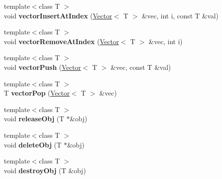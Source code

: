 \begin{DoxyCompactItemize}
\item 
{\footnotesize template$<$class T $>$ }\\void {\bfseries vector\+Insert\+At\+Index} (\hyperlink{struct_object_script_1_1_o_s_1_1_vector}{Vector}$<$ T $>$ \&vec, int i, const T \&val)\hypertarget{class_object_script_1_1_o_s_a0bf87d6ef789ccd8a3dcb03cbbb5893e}{}\label{class_object_script_1_1_o_s_a0bf87d6ef789ccd8a3dcb03cbbb5893e}

\item 
{\footnotesize template$<$class T $>$ }\\void {\bfseries vector\+Remove\+At\+Index} (\hyperlink{struct_object_script_1_1_o_s_1_1_vector}{Vector}$<$ T $>$ \&vec, int i)\hypertarget{class_object_script_1_1_o_s_a1f86dba5c944cc0ced0cf663e804514d}{}\label{class_object_script_1_1_o_s_a1f86dba5c944cc0ced0cf663e804514d}

\item 
{\footnotesize template$<$class T $>$ }\\void {\bfseries vector\+Push} (\hyperlink{struct_object_script_1_1_o_s_1_1_vector}{Vector}$<$ T $>$ \&vec, const T \&val)\hypertarget{class_object_script_1_1_o_s_ad45868237584994325441cbd1a6c28c8}{}\label{class_object_script_1_1_o_s_ad45868237584994325441cbd1a6c28c8}

\item 
{\footnotesize template$<$class T $>$ }\\T {\bfseries vector\+Pop} (\hyperlink{struct_object_script_1_1_o_s_1_1_vector}{Vector}$<$ T $>$ \&vec)\hypertarget{class_object_script_1_1_o_s_a8b0aeafee4b92af0950c7e15cda6cc48}{}\label{class_object_script_1_1_o_s_a8b0aeafee4b92af0950c7e15cda6cc48}

\item 
{\footnotesize template$<$class T $>$ }\\void {\bfseries release\+Obj} (T $\ast$\&obj)\hypertarget{class_object_script_1_1_o_s_ad2c2ff6c8961400a5aa613489f2d9004}{}\label{class_object_script_1_1_o_s_ad2c2ff6c8961400a5aa613489f2d9004}

\item 
{\footnotesize template$<$class T $>$ }\\void {\bfseries delete\+Obj} (T $\ast$\&obj)\hypertarget{class_object_script_1_1_o_s_a9907ba11acb315b3b0f37f63157f8011}{}\label{class_object_script_1_1_o_s_a9907ba11acb315b3b0f37f63157f8011}

\item 
{\footnotesize template$<$class T $>$ }\\void {\bfseries destroy\+Obj} (T \&obj)\hypertarget{class_object_script_1_1_o_s_aae0606378887e677fa4a8359ecda5f10}{}\label{class_object_script_1_1_o_s_aae0606378887e677fa4a8359ecda5f10}


\end{DoxyCompactItemize}
